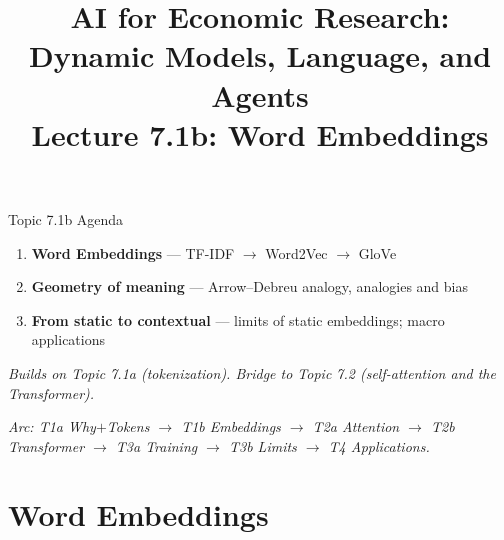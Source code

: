 


\graphicspath{{./pic/}{../../MiniCourse_8hr/Slides/Module3_LLM_Text/pic/}{../}}

\title[AI for Econ Research]{AI for Economic Research: Dynamic Models, Language, and Agents\\
Lecture 7.1b: Word Embeddings}



\makebeamertitle

\begin{frame}{Topic 7.1b Agenda}
\begin{enumerate}
  \item \textbf{Word Embeddings} --- TF-IDF $\to$ Word2Vec $\to$ GloVe
  \medskip
  \item \textbf{Geometry of meaning} --- Arrow--Debreu analogy, analogies and bias
  \medskip
  \item \textbf{From static to contextual} --- limits of static embeddings; macro applications
\end{enumerate}

\bigskip
\textit{Builds on Topic 7.1a (tokenization). Bridge to Topic 7.2 (self-attention and the Transformer).}

\medskip
\footnotesize\textit{Arc: T1a Why$+$Tokens $\to$ T1b Embeddings $\to$ T2a Attention $\to$ T2b Transformer $\to$ T3a Training $\to$ T3b Limits $\to$ T4 Applications.}
\end{frame}

\section{Word Embeddings}

